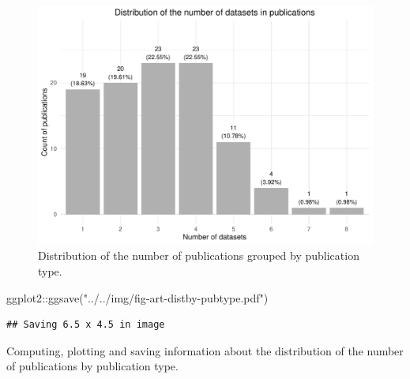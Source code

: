 \documentclass[
]{article}
\newenvironment{Shaded}{\begin{snugshade}}{\end{snugshade}}
\newcommand{\FunctionTok}[1]{\textcolor[rgb]{0.00,0.00,0.00}{#1}}
\newcommand{\NormalTok}[1]{#1}
\newcommand{\SpecialCharTok}[1]{\textcolor[rgb]{0.00,0.00,0.00}{#1}}
\newcommand{\StringTok}[1]{\textcolor[rgb]{0.31,0.60,0.02}{#1}}
\begin{document}
\begin{figure}

{\centering \includegraphics{../../img/fig-nodatasets-distribut} 

}

\caption{Distribution of the number of publications grouped by publication type.}\label{fig:bibliochecking7}
\end{figure}

\begin{Shaded}
\begin{Highlighting}[]
\NormalTok{ggplot2}\SpecialCharTok{::}\FunctionTok{ggsave}\NormalTok{(}\StringTok{"../../img/fig{-}art{-}distby{-}pubtype.pdf"}\NormalTok{)}
\end{Highlighting}
\end{Shaded}

\begin{verbatim}
## Saving 6.5 x 4.5 in image
\end{verbatim}

Computing, plotting and saving information about the distribution of the number of publications by publication type.
\end{document}
